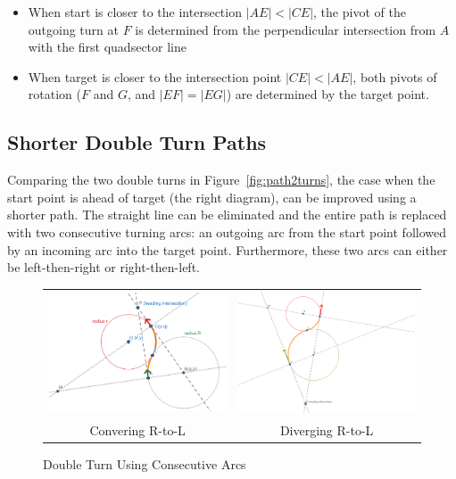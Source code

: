 \documentclass{article}
\begin{document}
\begin{itemize}
  \item When start is closer to the intersection $|AE| < |CE|$, the pivot of the
        outgoing turn at $F$ is determined from the perpendicular intersection from $A$
        with the first quadsector line
  \item When target is closer to the intersection point $|CE| < |AE|$, both
        pivots of rotation ($F$ and $G$, and $|EF| = |EG|$) are determined by the target point.
\end{itemize}

\subsection*{Shorter Double Turn Paths}
Comparing the two double turns in Figure~\ref{fig:path2turns},  the case when the start point
is ahead of target (the right diagram), can be improved using a shorter path.
The straight line can be eliminated and the entire path is replaced with two consecutive turning arcs: 
an outgoing arc from the start point
followed by an incoming arc into the target point. Furthermore, these two arcs can either be 
left-then-right or right-then-left.

\begin{figure}[hbt]
  \begin{tabular}{cc}
    \includegraphics[width=6cm]{screenshots/double-turns-right-left.png} & 
    \includegraphics[width=6cm]{screenshots/double-arcs-diverging-right-to-left.png}         \\
    Convering R-to-L                                                     & Diverging R-to-L
  \end{tabular}
  \caption{Double Turn Using Consecutive Arcs}
  \label{fig:double-RL}
\end{figure}
\end{document}
